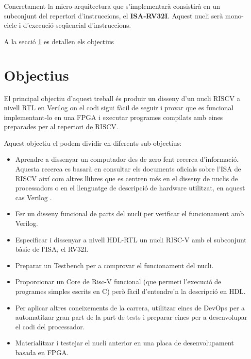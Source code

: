 \documentclass[10pt,a4paper,twocolumn,twoside]{article}
\begin{document}
Concretament la micro-arquitectura que s'implementarà consistirà en un subconjunt del repertori d’instruccions, el \textbf{ISA-RV32I}. 
Aquest nucli serà mono-cicle i d’execució seqüencial d’instruccions. 

A la secció \ref{sec:Obj} es detallen els objectius





\section{Objectius} 
\label{sec:Obj}
El principal objectiu d'aquest treball és produir un disseny d'un nucli RISCV a nivell RTL en Verilog on el codi sigui fàcil de seguir i provar que es funcional implementant-lo en una FPGA i executar programes compilats amb eines preparades per al repertori de RISCV.

Aquest objectiu el podem dividir en diferents sub-objectius:

\begin{itemize}

    \item Aprendre a dissenyar un computador des de zero fent recerca d'informació. Aquesta recerca es basarà en consultar els documents oficials sobre l'ISA de RISCV \cite{waterman_volume_2019} \cite{waterman_volume_2019-1}  així com altres llibres que es centren més en el disseny de nuclis de processadors \cite{patterson_computer_2018} o en el llenguatge de descripció de hardware utilitzat, en aquest cas Verilog \cite{li_implementing_2018}.
    
    \item Fer un disseny funcional de parts del nucli per verificar el funcionament amb Verilog.

    \item Especificar i dissenyar a nivell HDL-RTL un nucli RISC-V amb el subconjunt bàsic de l’ISA, el RV32I.
    
    \item Preparar un Testbench per a comprovar el funcionament del nucli.
    
    \item Proporcionar un Core de Risc-V funcional (que permeti l'execució de programes simples escrits en C) però fàcil d'entendre'n la descripció en HDL.
    
    \item Per aplicar altres coneixements de la carrera, utilitzar eines de DevOps per a automatitzar gran part de la part de tests i preparar eines per a desenvolupar el codi del processador.
    
    \item Materialitzar i testejar el nucli anterior en una placa de desenvolupament basada en FPGA.
    
        
\end{itemize}
\end{document}
